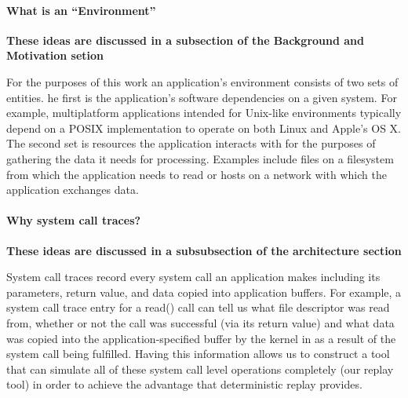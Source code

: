 
\paragraph{What is an ``Environment''}

\textbf{These ideas are discussed in a subsection of the Background and Motivation setion}

For the purposes of this work an application's environment consists of two sets of entities.  he first is the
application's software dependencies on a given system.  For example, multiplatform applications intended for Unix-like
environments typically depend on a POSIX implementation to operate on both Linux and Apple's OS X.  The second set is
resources the application interacts with for the purposes of gathering the data it needs for processing.  Examples
include files on a filesystem from which the application needs to read or hosts on a network with which the application
exchanges data.



\paragraph{Why system call traces?}

\textbf{These ideas are discussed in a subsubsection of the architecture section}


System call traces record every system call an application makes including its parameters, return value, and data copied
into application buffers.  For example, a system call trace entry for a read() call can tell us what file descriptor was
read from, whether or not the call was successful (via its return value) and what data was copied into the
application-specified buffer by the kernel in as a result of the system call being fulfilled.  Having this information
allows us to construct a tool that can simulate all of these system call level operations completely (our replay tool)
in order to achieve the advantage that deterministic replay provides.

